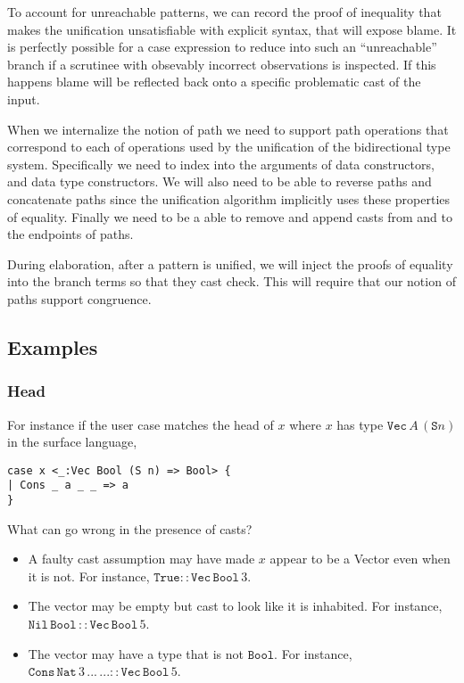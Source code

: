 To account for unreachable patterns, we can record the proof of inequality that makes the unification unsatisfiable with explicit syntax, that will expose blame.
It is perfectly possible for a case expression to reduce into such an ``unreachable'' branch if a scrutinee with obsevably incorrect observations is inspected.
If this happens blame will be reflected back onto a specific problematic cast of the input.

When we internalize the notion of path we need to support path operations that correspond to each of operations used by the unification of the bidirectional type system.
Specifically we need to index into the arguments of data constructors, and data type constructors.
We will also need to be able to reverse paths and concatenate paths since the unification algorithm implicitly uses these properties of equality.
Finally we need to be a able to remove and append casts from and to the endpoints of paths.

During elaboration, after a pattern is unified, we will inject the proofs of equality into the branch terms so that they cast check.
This will require that our notion of paths support congruence.

\subsection{Examples}

\subsubsection{Head}

For instance if the user case matches the head of $x$ where $x$ has type $\mathtt{Vec}\,A\,(\mathtt{S}n)$ in the surface language,

\begin{lstlisting}[basicstyle={\ttfamily\small}]
case x <_:Vec Bool (S n) => Bool> {
| Cons _ a _ _ => a
}
\end{lstlisting}

What can go wrong in the presence of casts?
\begin{itemize}
\item
A faulty cast assumption may have made $x$ appear to be a Vector even when it is not.
For instance, $\mathtt{True}::\mathtt{Vec}\,\mathtt{Bool}\,3$.
\item 
The vector may be empty but cast to look like it is inhabited.
For instance, $\mathtt{Nil}\,\mathtt{Bool}\,::\mathtt{Vec}\,\mathtt{Bool}\,5$.
\item 
The vector may have a type that is not $\mathtt{Bool}$.
For instance, $\mathtt{Cons}\,\mathtt{Nat}\,3\,...\,...::\mathtt{Vec}\,\mathtt{Bool}\,5$.
\end{itemize}

